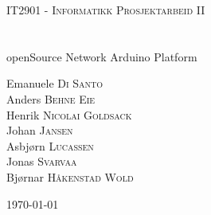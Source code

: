 \begin{titlepage}
	\begin{center}
		\textsc{\Large IT2901 - Informatikk Prosjektarbeid II}\\[0.5cm]
		\HRule \\[0.6cm]
		{ \huge \bfseries \project}\\[0.4cm]
		openSource Network Arduino Platform
		\HRule \\[1.5cm]
		\begin{center} \large
			Emanuele \textsc{Di Santo} \\
			Anders \textsc{Behne Eie} \\
			Henrik \textsc{Nicolai Goldsack} \\
			Johan \textsc{Jansen} \\
			Asbjørn \textsc{Lucassen} \\
			Jonas \textsc{Svarvaa} \\
			Bjørnar \textsc{Håkenstad Wold}
		\end{center}
		\vfill
		{\large \today}
	\end{center}
\end{titlepage}
